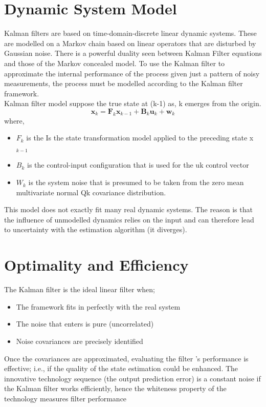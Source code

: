 \documentclass[12pt,a4paper]{article}
\begin{document}
\section*{Dynamic System Model}

Kalman filters are based on time-domain-discrete linear dynamic systems. These are modelled on a Markov chain based on linear operators that are disturbed by Gaussian noise. There is a powerful duality seen between Kalman Filter equations and those of the Markov concealed model. To use the Kalman filter to approximate the internal performance of the process given just a pattern of noisy measurements, the process must be modelled according to the Kalman filter framework. \cite{li2019boundedness}\\
Kalman filter model suppose the true state at (k-1) as, k emerges from the origin.
\begin{equation}
\mathbf{x}_{k}=\mathbf{F}_{k} \mathbf{x}_{k-1}+\mathbf{B}_{k} \mathbf{u}_{k}+\mathbf{w}_{k}
\end{equation}
where,
\begin{itemize}
  \item $F_{k}$ is the Is the state transformation model applied to the preceding state x$_{k-1}$
  \item $B_{k}$ is the control-input configuration that is used for the uk control vector
  \item $W_{k}$ is the system noise that is presumed to be taken from the zero mean multivariate normal Qk covariance distribution.
\end{itemize}
This model does not exactly fit many real dynamic systems. The reason is that the influence of unmodelled dynamics relies on the input and can therefore lead to uncertainty with the estimation algorithm (it diverges).\\
\section*{Optimality and Efficiency}
The Kalman filter is the ideal linear filter when;
\begin{itemize}
  \item The framework fits in perfectly with the real system
  \item The noise that enters is pure (uncorrelated)
  \item Noise covariances are precisely identified
\end{itemize}
Once the covariances are approximated, evaluating the filter 's performance is effective; i.e., if the quality of the state estimation could be enhanced. The innovative technology sequence (the output prediction error) is a constant noise if the Kalman filter works efficiently, hence the whiteness property of the technology measures filter performance \cite{strid2009block}\\
\end{document}

